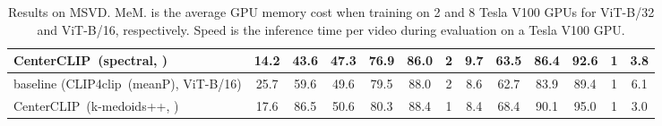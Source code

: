 \documentclass[sigconf]{acmart}
\begin{document}
\begin{table*}[!t]
{\begin{tabular}{lcc|ccccc|ccccc}
			CenterCLIP~(spectral, )
			& 14.2 & 43.6 
			& 47.3 & 76.9 & 86.0 & 2 & 9.7
			& 63.5 & 86.4 & 92.6 & 1 & 3.8  \\
			
			\midrule
			baseline (CLIP4clip~(meanP), ViT-B/16)
			& 25.7 & 59.6
			& 49.6 & 79.5 & 88.0 & 2 & 8.6
			& 62.7 & 83.9 & 89.4 & {1} & 6.1 \\			

			CenterCLIP~(k-medoids++, )
			& 17.6 & 86.5 
			& \cellcolor{Gray}50.6 & \cellcolor{Gray}80.3 & \cellcolor{Gray}88.4 & \cellcolor{Gray}1 &  \cellcolor{Gray}8.4 
			& \cellcolor{Gray}68.4 & \cellcolor{Gray}90.1 & \cellcolor{Gray}95.0 & \cellcolor{Gray}1 & \cellcolor{Gray}3.0 \\						
			\bottomrule
		\end{tabular}
	}
	\caption{ Results on MSVD.  
		MeM. is the average GPU memory cost when training on 2 and 8 Tesla V100 GPUs for ViT-B/32 and ViT-B/16, respectively.
		Speed is the inference time per video during evaluation on a Tesla V100 GPU. 
	}
	\label{tab:result_MSVD}
\end{table*}
\end{document}
